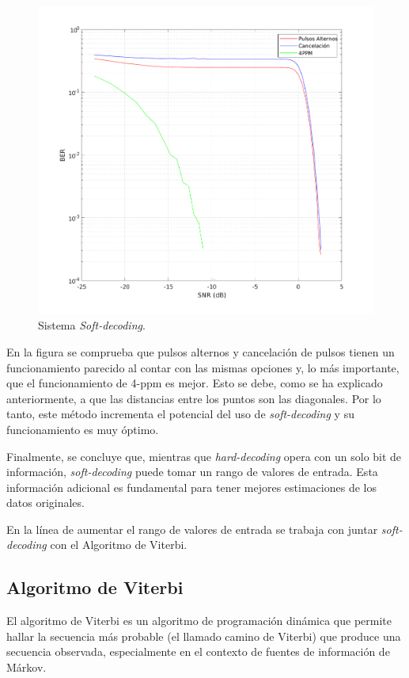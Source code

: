 \begin{figure}[ht]
    \centering
    \includegraphics[scale=0.5]{./figuras/Soft.pdf}
    \caption{\small{Sistema \textit{Soft-decoding}.}}
    \label{soft-decoding}%
\end{figure}

En la figura se comprueba que pulsos alternos y cancelación de pulsos tienen un 
funcionamiento parecido al contar con las mismas opciones y, lo más importante, que
el funcionamiento de 4-ppm es mejor. Esto se debe, como se ha explicado anteriormente,
a que las distancias entre los puntos son las diagonales. Por lo tanto,
este método incrementa el potencial del 
uso de \textit{soft-decoding} y su funcionamiento es muy óptimo. 

Finalmente, se concluye que, mientras que \textit{hard-decoding} opera con un solo bit de 
información, \textit{soft-decoding} puede tomar un rango de valores de entrada. Esta 
información adicional es fundamental para tener mejores estimaciones de los datos
originales.

En la línea de aumentar el rango de valores de entrada se trabaja con juntar 
\textit{soft-decoding} con el Algoritmo de Viterbi.


\subsection{Algoritmo de Viterbi}
El algoritmo de Viterbi es un algoritmo de programación dinámica que permite hallar 
la secuencia más probable (el llamado camino de Viterbi) que produce 
una secuencia observada, especialmente en el contexto de fuentes de información 
de Márkov.

